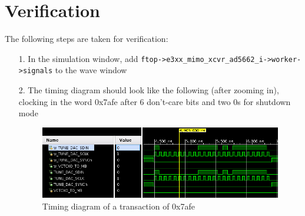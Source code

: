 \section{Verification}
The following steps are taken for verification:
	\begin{itemize}
		\item[1.] In the simulation window, add \verb!ftop->e3xx_mimo_xcvr_ad5662_i->worker->signals! to the wave window
		\item[2.] The timing diagram should look like the following (after zooming in), clocking in the word 0x7afe after 6 don't-care bits and two 0s for shutdown mode
		\begin{figure}[ht]
	\centerline{\includegraphics[scale=0.75]{timing}}
	\caption{Timing diagram of a transaction of 0x7afe}
	\label{fig:tb}
\end{figure}
	\end{itemize}


